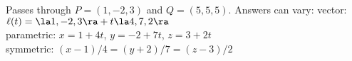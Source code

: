 {Passes through $P=(1,-2,3)$ and $Q = (5,5,5)$.
}
{Answers can vary:
vector: $\ell(t) = \la 1,-2,3\ra + t\la 4,7,2\ra$\\
parametric: $x= 1+4t$, $y=-2+7t$, $z = 3+2t$\\
symmetric: $(x-1)/4 =(y+2)/7 = (z-3)/2$
}

